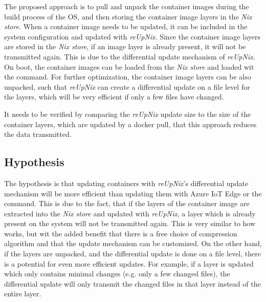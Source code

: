 The proposed approach is to pull and unpack the container images during the build
process of the \ac{OS}, and then storing the container image layers in the
\textit{Nix store}. When a container image needs to be updated, it can
be included in the system configuration and updated with \textit{reUpNix}.
Since the container image layers are stored in the \textit{Nix store}, if an
image layer is already present, it will not be transmitted again. This is due
to the differential update mechanism of \textit{reUpNix}.
On boot, the container images can be loaded from the \textit{Nix store} and
loaded wit the  command.
For further optimization, the container image layers can be also unpacked,
such that \textit{reUpNix} can create a differential update on a file level for
the layers, which will be very efficient if only a few files have changed.

It needs to be verified by comparing the \textit{reUpNix} update size to the size of the container layers,
which are updated by a docker pull, that this approach reduces the data transmitted.

\subsection{Hypothesis}
The hypothesis is that updating containers with \textit{reUpNix}'s differential
update mechanism will be more efficient than updating them with Azure IoT Edge or
the  command. This is due to the fact, that if the
layers of the container image are extracted into the \textit{Nix store} and
updated with \textit{reUpNix}, a layer which is already present on the system
will not be transmitted again. This is very similar to how 
works, but wit the added benefit that there is a free choice of compression
algorithm and that the update mechanism can be customized. On the other hand,
if the layers are unpacked, and the differential update is done on a file level,
there is a potential for even more efficient updates. For example, if a layer
is updated which only contains minimal changes (e.g. only a few
changed files), the differential update will only transmit the changed files in
that layer instead of the entire layer.

